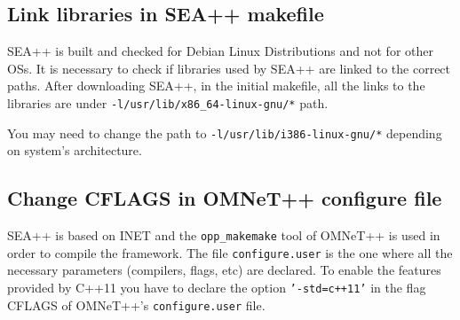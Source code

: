 \subsection{Link libraries in SEA++ makefile}
SEA++ is built and checked for Debian Linux Distributions and not for other OSs. It is necessary to check if libraries used by SEA++ are linked to the correct paths. After downloading SEA++, in the initial makefile, all the links to the libraries are under \texttt{-l/usr/lib/x86\_64-linux-gnu/*} path.

You may need to change the path to \texttt{-l/usr/lib/i386-linux-gnu/*} depending on system's architecture.


\subsection{Change CFLAGS in OMNeT++ configure file}
SEA++ is based on INET and the \texttt{opp\_makemake} tool of OMNeT++ is used in order to compile the framework. The file \texttt{configure.user} is the one where all the necessary parameters (compilers, flags, etc) are declared. To enable the features provided by C++11 you have to declare the option \texttt{'-std=c++11'} in the flag CFLAGS of OMNeT++'s \texttt{configure.user} file.


